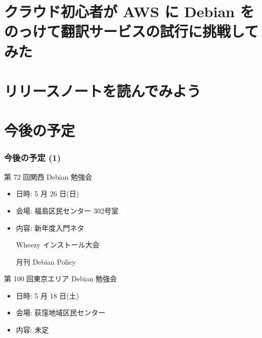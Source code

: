 \documentclass[cjk,dvipdfmx,10pt,compress,%
hyperref={bookmarks=true,bookmarksnumbered=true,bookmarksopen=false,%
colorlinks=false,%
pdftitle={第 71 回 関西 Debian 勉強会},%
pdfauthor={倉敷・のがた・佐々木・かわだ・八津尾},%
pdfsubject={資料},%
}]{beamer}
\begin{document}

\section{クラウド初心者が AWS に Debian をのっけて翻訳サービスの試行に挑戦してみた}


\section{リリースノートを読んでみよう}


\section{今後の予定}
\begin{frame}[fragile]
\frametitle{今後の予定 (1)}

\begin{block}{第 72 回関西 Debian 勉強会}
  \begin{itemize}
  \item 日時: 5 月 26 日(日)
  \item 会場: 福島区民センター 302号室
  \item 内容: 新年度入門ネタ

    Wheezy インストール大会

    月刊 Debian Policy
  \end{itemize}
\end{block}

\begin{block}{第 100 回東京エリア Debian 勉強会}
  \begin{itemize}
  \item 日時: 5 月 18 日(土)
  \item 会場: 荻窪地域区民センター
  \item 内容: 未定
  \end{itemize}
\end{block}

\end{frame}
\end{document}
